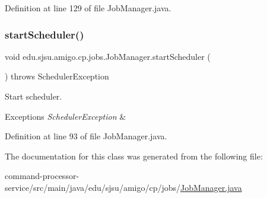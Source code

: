 Definition at line 129 of file Job\+Manager.\+java.

\mbox{\label{classedu_1_1sjsu_1_1amigo_1_1cp_1_1jobs_1_1_job_manager_ab864aafc50469b61907b86fd72a55b85}} 
\subsubsection{\texorpdfstring{start\+Scheduler()}{startScheduler()}}
{\footnotesize\ttfamily void edu.\+sjsu.\+amigo.\+cp.\+jobs.\+Job\+Manager.\+start\+Scheduler (\begin{DoxyParamCaption}{ }\end{DoxyParamCaption}) throws Scheduler\+Exception}

Start scheduler.


\begin{DoxyExceptions}{Exceptions}
{\em Scheduler\+Exception} & \\
\hline
\end{DoxyExceptions}


Definition at line 93 of file Job\+Manager.\+java.



The documentation for this class was generated from the following file\+:\begin{DoxyCompactItemize}
\item 
command-\/processor-\/service/src/main/java/edu/sjsu/amigo/cp/jobs/\hyperlink{_job_manager_8java}{Job\+Manager.\+java}\end{DoxyCompactItemize}
